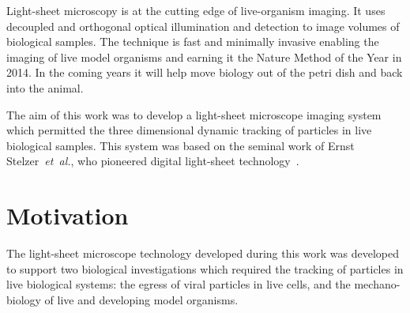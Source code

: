 
Light-sheet microscopy is at the cutting edge of live-organism imaging.
It uses decoupled and orthogonal optical illumination and detection to image volumes of biological samples.
The technique is fast and minimally invasive enabling the imaging of live model organisms and earning it the Nature Method of the Year in 2014.
In the coming years it will help move biology out of the petri dish and back into the animal.

The aim of this work was to develop a \gls{light-sheet} microscope imaging system which permitted the three dimensional dynamic tracking of particles in live biological samples.
This system was based on the seminal work of Ernst Stelzer~\emph{et~al.}, who pioneered digital \gls{light-sheet} technology~\cite{huisken_optical_2004}.

\pagebreak

\section{Motivation}
The light-sheet microscope technology developed during this work was developed to support two biological investigations which required the tracking of particles in live biological systems: the egress of viral particles in live cells, and the mechano-biology of live and developing model organisms.

